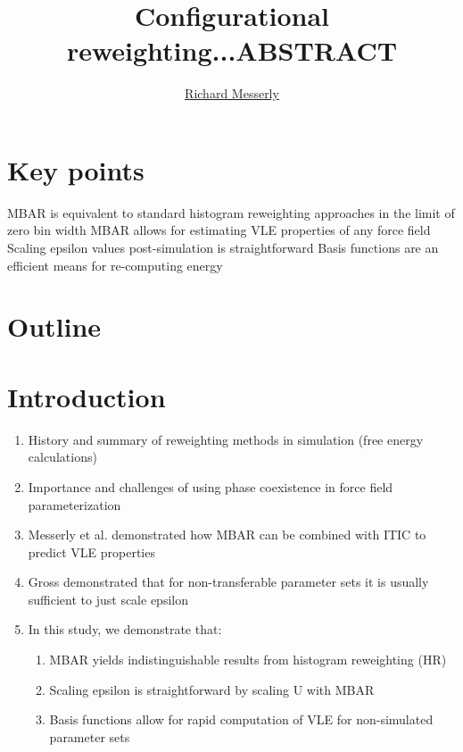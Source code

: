 \documentclass[11pt,a4paper]{article}
\begin{document}
	\thispagestyle{empty}
	\title{\Large \textbf{Configurational reweighting...}}
	\author[1]{\large {\underline{Richard Messerly}}}%
	
	
	\date{} %
	\maketitle\thispagestyle{empty} %
	\begin{center}
		\title{\textbf{ABSTRACT}}\centering{}
	\end{center}
	\justify
	
\section*{Key points}

MBAR is equivalent to standard histogram reweighting approaches in the limit of zero bin width
MBAR allows for estimating VLE properties of any force field
Scaling epsilon values post-simulation is straightforward
Basis functions are an efficient means for re-computing energy

\section*{Outline}

\section{Introduction}

\begin{enumerate}
	\item History and summary of reweighting methods in simulation (free energy calculations)
	\item Importance and challenges of using phase coexistence in force field parameterization
	\item Messerly et al. demonstrated how MBAR can be combined with ITIC to predict VLE properties
	\item Gross demonstrated that for non-transferable parameter sets it is usually sufficient to just scale epsilon
	\item In this study, we demonstrate that:
	\begin{enumerate}
		\item MBAR yields indistinguishable results from histogram reweighting (HR)
		\item Scaling epsilon is straightforward by scaling U with MBAR
		\item Basis functions allow for rapid computation of VLE for non-simulated parameter sets
	\end{enumerate}
\end{enumerate}
\end{document}
